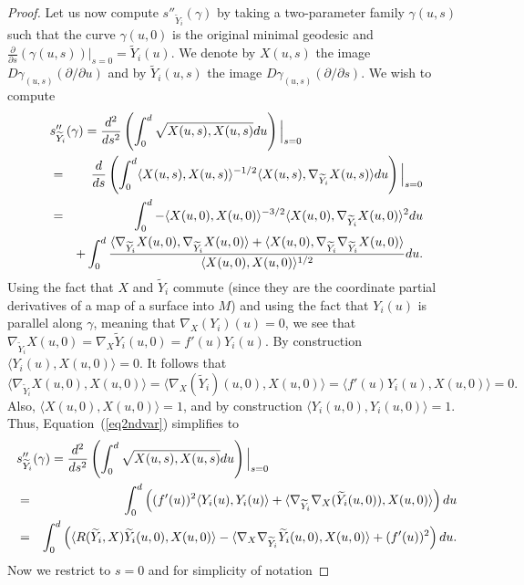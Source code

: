 \begin{proof}
Let us now compute $s''_{\widetilde Y_i}(\gamma)$ by taking a
two-parameter family $\gamma(u,s)$ such that the curve $\gamma(u,0)$
is the original minimal geodesic and $\frac{\partial}{\partial
s}(\gamma(u,s))|_{s=0}=\widetilde Y_i(u)$.  We denote by $X(u,s)$
the image $D\gamma_{(u,s)}(\partial/\partial u)$ and by $\widetilde
Y_i(u,s)$ the image $D\gamma_{(u,s)}(\partial/\partial s)$. We wish
to compute
\begin{eqnarray}
\lefteqn{s''_{\widetilde Y_i}(\gamma) =
\frac{d^2}{ds^2}\left(\int_0^d\sqrt{X(u,s),X(u,s)}du\right)\Bigl|_{s=0}\Bigr.}
& &
 \nonumber \\
& = & \frac{d}{ds}\left(\int_0^d\langle X(u,s),X(u,s)\rangle^{-1/2}
\langle
X(u,s),\nabla_{\widetilde Y_i}X(u,s)\rangle du\right)\Bigl|_{s=0}\Bigr. \nonumber \\
& = &  \int_0^d-\langle X(u,0),X(u,0)\rangle^{-3/2}\langle
X(u,0),\nabla_{\widetilde
Y_i}X(u,0)\rangle^2du \label{eq2ndvar} \\
& &  +\int_0^d\frac{\langle \nabla_{\widetilde
Y_i}X(u,0),\nabla_{\widetilde Y_i}X(u,0)\rangle +\langle
X(u,0),\nabla_{\widetilde Y_i}\nabla_{\widetilde
Y_i}X(u,0)\rangle}{\langle X(u,0),X(u,0)\rangle^{1/2}}du \nonumber.
\end{eqnarray}
Using the fact that $X$ and $\widetilde Y_i$ commute (since they are
the coordinate partial derivatives of a map of a surface into $M$)
and using the fact that $Y_i(u)$ is parallel along $\gamma$, meaning
that $\nabla_X(Y_i)(u)=0$, we see that $\nabla_{\widetilde
Y_i}X(u,0)=\nabla_X\widetilde Y_i(u,0)=f'(u)Y_i(u)$. By construction
$\langle Y_i(u),X(u,0)\rangle=0$. It follows that
$$\langle \nabla_{\widetilde Y_i}X(u,0),X(u,0)\rangle=\langle \nabla_X(\widetilde
Y_i)(u,0),X(u,0)\rangle = \langle f'(u)Y_i(u),X(u,0)\rangle =0.$$
Also, $\langle X(u,0),X(u,0)\rangle=1$, and by construction $\langle
Y_i(u,0),Y_i(u,0)\rangle=1$. Thus, Equation~(\ref{eq2ndvar})
simplifies to
\begin{eqnarray}
\lefteqn{s''_{\widetilde
Y_i}(\gamma)=\frac{d^2}{ds^2}\left(\int_0^d\sqrt{X(u,s),X(u,s)}du\right)\Bigl|_{s=0}\Bigr.
 \label{2ndvaria}}
\\& = & \int_0^d\left((f'(u))^2\langle
Y_i(u),Y_i(u)\rangle+\langle \nabla_{\widetilde
Y_i}\nabla_X(\widetilde
Y_i(u,0)),X(u,0)\rangle\right)du \nonumber\\
& = & \int_0^d\left(\langle R(\widetilde Y_i,X)\widetilde
Y_i(u,0),X(u,0)\rangle-\langle \nabla_X\nabla_{\widetilde
Y_i}\widetilde Y_i(u,0),X(u,0)\rangle+(f'(u))^2\right)
du.\nonumber\end{eqnarray} Now we restrict to $s=0$ and for simplicity of notation

\end{proof}
